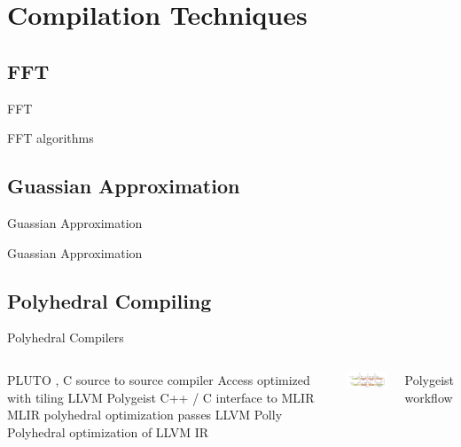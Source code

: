\documentclass{beamer}
\begin{document}
\section{Compilation Techniques}
\subsection{FFT}
\begin{frame}{FFT}
\begin{outline}
  \1 FFT algorithms \cite{Ahmad2021} \cite{Ahmad2023} \cite{Ahmad2023}
\end{outline}
\end{frame}

\subsection{Guassian Approximation}
\begin{frame}{Guassian Approximation}
\begin{outline}
  \1 Guassian Approximation \cite{Ahmad2022Brief}
\end{outline}
\end{frame}

\subsection{Polyhedral Compiling}
\begin{frame}{Polyhedral Compilers}
\begin{columns}
\centering
\begin{outline}
  \1 PLUTO \cite{Bondhugula2008}, \cite{Bondhugula2008Pract}
    \2 C source to source compiler
    \2 Access optimized with tiling
  \1 LLVM Polygeist \cite{Moses2021} 
    \2 C++ / C interface to MLIR \cite{Lattner2021}
    \2 MLIR polyhedral optimization passes
  \1 LLVM Polly \cite{Grosser2012} 
    \2 Polyhedral optimization of LLVM IR
\end{outline}
\centering
\includegraphics[width=4cm]{../../assets/polygeist_workflow.png}

Polygeist workflow

\end{columns}
\end{frame}
\end{document}
